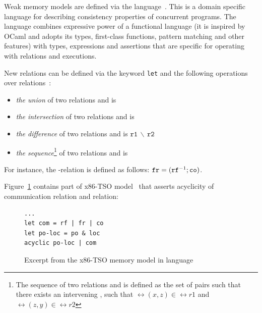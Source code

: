 Weak memory models are defined via the \cat language~\cite{alglave2016syntax}.
This is a domain specific language for describing consistency properties of concurrent programs.
The \cat language combines expressive power of a functional language (it is inspired by OCaml and adopts its types, first-class functions, pattern matching and other features) with types, expressions and assertions that are specific for operating with relations and executions.



New relations can be defined via the keyword \texttt{let} and the following operations over relations~\cite{alglave2016syntax}: %

\begin{itemize}
	\item \textit{the union} of two relations  and  is 
	\item \textit{the intersection} of two relations  and  is 
	\item \textit{the difference} of two relations  and  is $\mathtt{r1\,\backslash\,r2}$
	\item \textit{the sequence}\footnote{The sequence of two relations  and  is defined as the set of pairs  such that there exists an intervening , such that $\rel{(x,z)} \in \rel{r1}$ and $\rel{(z,y)} \in \rel{r2}$}
	of two relations  and  is 
\end{itemize}

For instance, the \fr-relation is defined as follows: $\mathtt{fr} = (\mathtt{rf}^{-1};\mathtt{co})$.

Figure~\ref{example:x86-cat} contains part of x86-TSO model~\cite{owens2009better} that asserts acyclicity of communication relation and  relation:

\begin{figure}[!h]
\begin{lstlisting}
...
let com = rf | fr | co
let po-loc = po & loc
acyclic po-loc | com
\end{lstlisting}
\caption{Excerpt from the x86-TSO memory model in \cat language}
\label{example:x86-cat}
\end{figure}


